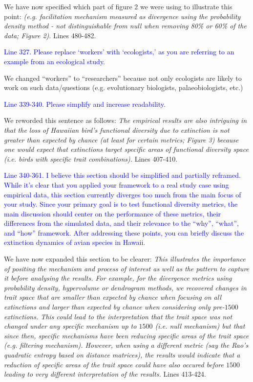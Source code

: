 \documentclass[
]{article}
\begin{document}
We have now specified which part of figure 2 we were using to illustrate this point:
\textit{(e.g. facilitation mechanism measured as divergence using the probability density method - not distinguishable from null when removing 80\% or 60\% of the data; Figure 2)}. Lines 480-482.

\textcolor{blue}{Line 327. Please replace `workers' with `ecologists,' as you are referring to an example from an ecological study.}

We changed ``workers'' to ``researchers'' because not only ecologists are likely to work on such data/questions (e.g. evolutionary biologists, palaeobiologists, etc.)

\textcolor{blue}{Line 339-340. Please simplify and increase readability.}

We reworded this sentence as follows:
\textit{The empirical results are also intriguing in that the loss of Hawaiian bird's functional diversity due to extinction is not greater than expected by chance (at least for certain metrics; Figure 3) because one would expect that extinctions target specific areas of functional diversity space (i.e. birds with specific trait combinations).}
Lines 407-410.

\textcolor{blue}{Line 340-361. I believe this section should be simplified and partially reframed.
While it's clear that you applied your framework to a real study case using empirical data, this section currently diverges too much from the main focus of your study.
Since your primary goal is to test functional diversity metrics, the main discussion should center on the performance of these metrics, their differences from the simulated data, and their relevance to the ``why'', ``what'', and ``how'' framework.
After addressing these points, you can briefly discuss the extinction dynamics of avian species in Hawaii.}

We have now expanded this section to be clearer:
\textit{This illustrates the importance of positing the mechanism and process of interest as well as the pattern to capture it before analysing the results.
For example, for the divergence metrics using probability density, hypervolume or dendrogram methods, we recovered changes in trait space that are smaller than expected by chance when focusing on all extinctions and larger than expected by chance when considering only pre-$1500$ extinctions.
This could lead to the interpretation that the trait space was not changed under any specific mechanism up to $1500$ (i.e. null mechanism) but that since then, specific mechanisms have been reducing specific areas of the trait space (e.g. filtering mechanism).
However, when using a different metric (say the Rao's quadratic entropy based on distance matrices), the results would indicate that a reduction of specific areas of the trait space could have also occured before $1500$ leading to very different interpretation of the results.}
Lines 413-424.
\end{document}
